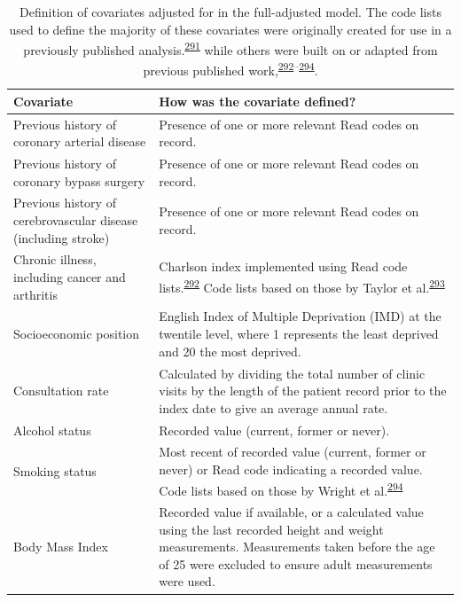\documentclass[a4paper, twoside]{templates/ociamthesis}
\begin{document}
\begin{table}[H]

\caption[Covariates adjusted for.]{\label{tab:covariateDef-table}Definition of covariates adjusted for in the full-adjusted model. The code lists used to define the majority of these covariates were originally created for use in a previously published analysis.\textsuperscript{\protect\hyperlink{ref-walker2020}{291}} while others were built on or adapted from previous published work,\textsuperscript{\protect\hyperlink{ref-khan2010}{292}--\protect\hyperlink{ref-wright2017}{294}}.}
\centering
\fontsize{9}{11}\selectfont
\begin{tabular}[t]{>{\raggedright\arraybackslash}p{15em}>{\centering\arraybackslash}p{25em}}
\toprule
\textbf{Covariate } & \textbf{How was the covariate defined?}\\
\midrule
Previous history of coronary arterial disease & Presence of one or more relevant Read codes on record.\\
\midrule
Previous history of coronary bypass surgery & Presence of one or more relevant Read codes on record.\\
\midrule
Previous history of cerebrovascular disease (including stroke) & Presence of one or more relevant Read codes on record.\\
\midrule
Chronic illness, including cancer and arthritis & Charlson index implemented using Read code lists.\textsuperscript{\protect\hyperlink{ref-khan2010}{292}} Code lists based on those by Taylor et al.\textsuperscript{\protect\hyperlink{ref-taylor2016}{293}}\\
\midrule
Socioeconomic position & 2010 English Index of Multiple Deprivation (IMD) at the twentile level, where 1 represents the least deprived and 20 the most deprived.\\
\midrule
\addlinespace
Consultation rate & Calculated by dividing the total number of clinic visits by the length of the patient record prior to the index date to give an average annual rate.\\
\midrule
Alcohol status & Recorded value (current, former or never).\\
\midrule
Smoking status & Most recent of recorded value (current, former or never) or Read code indicating a recorded value. Code lists based on those by Wright et al.\textsuperscript{\protect\hyperlink{ref-wright2017}{294}}\\
\midrule
Body Mass Index & Recorded value if available, or a calculated value using the last recorded height and weight measurements. Measurements taken before the age of 25 were excluded to ensure adult measurements were used.\\

\end{tabular}
\end{table}
\end{document}
